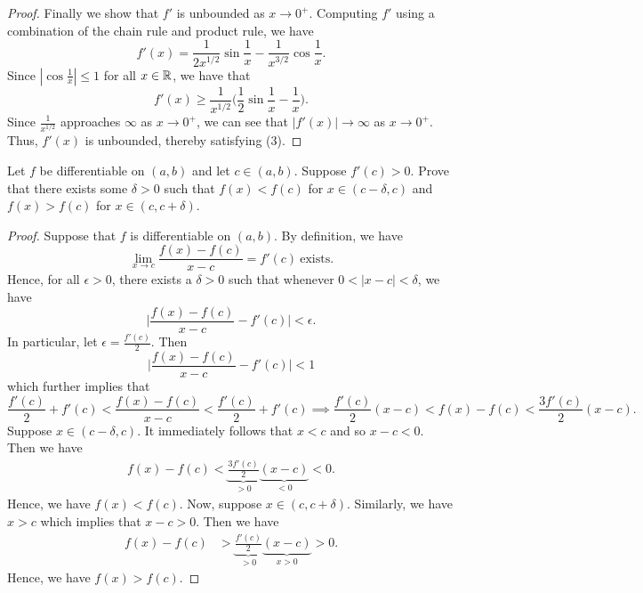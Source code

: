 \documentclass[a4paper]{article}
\begin{document}
\begin{proof}
    Finally we show that \( f' \) is unbounded as \( x \to 0^{+} \). Computing \( f'  \) using a combination of the chain rule and product rule, we have  
    \[  f'(x) = \frac{ 1 }{ 2 x^{1/2} } \sin \frac{ 1 }{ x }  - \frac{ 1 }{ x^{3/2} } \cos \frac{ 1 }{ x }. \]
    Since \( | \cos \frac{ 1 }{ x }  | \leq 1  \) for all \( x \in \mathbb{R}  \), we have that 
    \[  f'(x) \geq \frac{ 1 }{ x^{1/2} }  \Big(  \frac{ 1 }{ 2 }  \sin \frac{ 1 }{ x }  - \frac{ 1 }{ x }  \Big). \]
    Since \( \frac{ 1 }{ x^{1/2} }  \) approaches \( \infty   \) as \( x \to 0^{+} \), we can see that \( | f'(x) | \to \infty   \) as \( x \to 0^{+} \). Thus, \( f'(x)   \) is unbounded, thereby satisfying (3).
\end{proof}

\begin{problem}
    Let \( f  \) be differentiable on \( (a,b) \) and let \( c \in (a,b) \). Suppose \( f'(c) > 0  \). Prove that there exists some \( \delta > 0  \) such that \( f(x) < f(c) \) for \( x \in (c - \delta, c) \) and \( f(x) > f(c) \) for \( x \in (c, c + \delta) \).
\end{problem}
\begin{proof}
Suppose that \( f  \) is differentiable on \( (a,b) \). By definition, we have 
\[  \lim_{ x \to c }  \frac{ f(x) - f(c) }{  x - c  } = f'(c)  \ \text{exists}. \]
Hence, for all \( \epsilon > 0  \), there exists a \( \delta > 0  \) such that whenever \( 0 < |  x - c  |  < \delta \), we have 
\[  \Big| \frac{ f(x) - f(c) }{ x - c  }  - f'(c) \Big| < \epsilon. \]
In particular, let \( \epsilon = \frac{ f'(c) }{ 2 }   \). Then  
\[  \Big| \frac{ f(x) - f(c) }{  x - c  }  - f'(c) \Big| < 1 \tag{*}  \]
which further implies that 
\[  \frac{ f'(c)   }{ 2 }  + f'(c) < \frac{ f(x) - f(c) }{ x - c  }  < \frac{ f'(c) }{ 2 }  + f'(c) \implies \frac{ f'(c)   }{ 2 } (x-c) < f(x) - f(c) < \frac{ 3 f'(c) }{ 2 }  (x - c).  \]
Suppose \( x \in (c-\delta, c) \). It immediately follows that \( x < c  \) and so \( x - c < 0  \). Then we have 
\begin{align*}
    f(x) - f(c) < \underbrace{\frac{ 3 f'(c) }{ 2  }}_{>0}  \underbrace{(x - c)}_{<0} 
                < 0.
\end{align*}
Hence, we have \( f(x) < f(c) \). Now, suppose \( x \in (c , c + \delta) \). Similarly, we have \( x > c  \) which implies that \( x - c > 0  \). Then we have 
\begin{align*}
    f(x) - f(c )&> \underbrace{\frac{ f'(c) }{ 2  }}_{>0}  \underbrace{(x - c)}_{x > 0} 
                > 0.
\end{align*}
Hence, we have \( f(x) > f(c) \).
\end{proof} 
\end{document}
